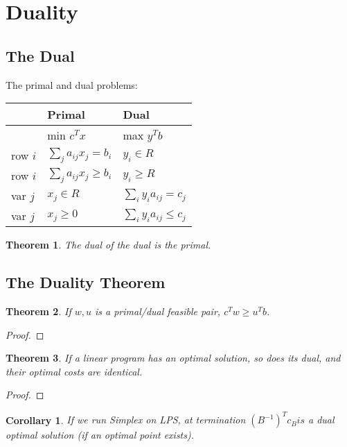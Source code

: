 \documentclass[11pt]{article} %
\theoremstyle{plain}%
\newtheorem{thm}{Theorem}[section]
\newtheorem*{cor}{Corollary}
\theoremstyle{definition}
\theoremstyle{remark}
\begin{document}
\section{Duality}

\subsection{The Dual}
The primal and dual problems: 
\begin{center}
\begin{tabular}{l|l l}
 & Primal & Dual \\
 \hline
 & min $c^T x$ & max $y^T b$\\
 row $i$ & $\sum_j a_{ij} x_j = b_i$ & $y_i \in R$\\
 row $i$ & $\sum_j a_{ij} x_j \geq b_i$ & $y_i \geq R$\\
 var $j$ & $x_j \in R$ & $\sum_i y_i a_{ij} = c_j$\\
 var $j$ & $x_j \geq 0$ & $\sum_i y_i a_{ij} \leq c_j$\\
\end{tabular}
\end{center}

\begin{thm}
The dual of the dual is the primal. 
\end{thm}

\subsection{The Duality Theorem}

\begin{thm}
If $w, u$ is a primal/dual feasible pair, $ c^T w \geq u^T b$. 
\end{thm}

\begin{proof}

\end{proof}

\begin{thm}
If a linear program has an optimal solution, so does its dual, and their optimal 
costs are identical. 
\end{thm}

\begin{proof}

\end{proof}

\begin{cor}
If we run Simplex on LPS, at termination $(B^{-1})^T c_B is$ a dual optimal solution
(if an optimal point exists). 
\end{cor}
\end{document}

